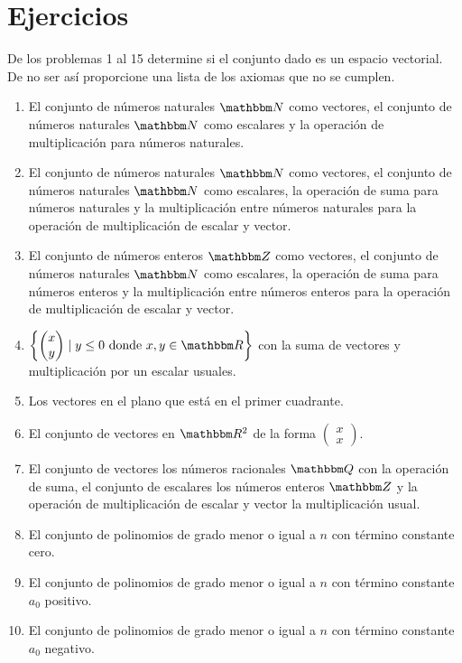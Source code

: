 \newpage

\section{Ejercicios}

\noindent
De los problemas 1 al 15 determine si el conjunto dado es un espacio vectorial. De no ser así proporcione una lista de los axiomas que no se cumplen.
\begin{enumerate}
    \item El conjunto de números naturales $\NN$ como vectores, el conjunto de números naturales $\NN$ como escalares y la operación de multiplicación para números naturales.
    \item El conjunto de números naturales $\NN$ como vectores, el conjunto de números naturales $\NN$ como escalares, la operación de suma para números naturales y la multiplicación entre números naturales para la operación de multiplicación de escalar y vector.
    \item El conjunto de números enteros $\ZZ$ como vectores, el conjunto de números naturales $\NN$ como escalares, la operación de suma para números enteros y la multiplicación entre números enteros para la operación de multiplicación de escalar y vector.
    \item $\left\{ \begin{pmatrix} x \\ y \end{pmatrix} \mid y \leq 0 \text{ donde } x, y \in \RR \right\}$ con la suma de vectores y multiplicación por un escalar usuales.
    \item Los vectores en el plano que está en el primer cuadrante.
    \item El conjunto de vectores en $\RR[2]$ de la forma $\begin{pmatrix} x \\ x \end{pmatrix}$.
    \item El conjunto de vectores los números racionales $\QQ$ con la operación de suma, el conjunto de escalares los números enteros $\ZZ$ y la operación de multiplicación de escalar y vector la multiplicación usual.
    \item El conjunto de polinomios de grado menor o igual a $n$ con término constante cero.
    \item El conjunto de polinomios de grado menor o igual a $n$ con término constante $a_{0}$ positivo.
    \item El conjunto de polinomios de grado menor o igual a $n$ con término constante $a_{0}$ negativo.

\end{enumerate}
